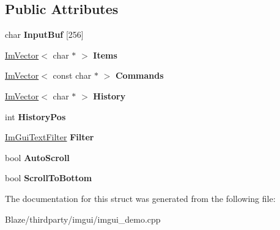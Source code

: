 \subsection*{Public Attributes}
\begin{DoxyCompactItemize}
\item 
\mbox{\label{structExampleAppConsole_ab30accde81ae6833bd2ecf35f43f01ab}} 
char {\bfseries Input\+Buf} \mbox{[}256\mbox{]}
\item 
\mbox{\label{structExampleAppConsole_acfde7d45fb733ac72d5d500168557b36}} 
\hyperlink{structImVector}{Im\+Vector}$<$ char $\ast$ $>$ {\bfseries Items}
\item 
\mbox{\label{structExampleAppConsole_a1eebee69cceb0345cf9d9b6e6beb9d03}} 
\hyperlink{structImVector}{Im\+Vector}$<$ const char $\ast$ $>$ {\bfseries Commands}
\item 
\mbox{\label{structExampleAppConsole_a11c7fa54e744288f3606e4d6521d6345}} 
\hyperlink{structImVector}{Im\+Vector}$<$ char $\ast$ $>$ {\bfseries History}
\item 
\mbox{\label{structExampleAppConsole_a2508db0a7d205947cea65b141d4ed589}} 
int {\bfseries History\+Pos}
\item 
\mbox{\label{structExampleAppConsole_a5526ec74c611e1152fb13162cd01e6da}} 
\hyperlink{structImGuiTextFilter}{Im\+Gui\+Text\+Filter} {\bfseries Filter}
\item 
\mbox{\label{structExampleAppConsole_a01c861ed21b9ec8de5e1ee2c762c627a}} 
bool {\bfseries Auto\+Scroll}
\item 
\mbox{\label{structExampleAppConsole_a69b1406795fd71a3757761b0767ea1c5}} 
bool {\bfseries Scroll\+To\+Bottom}
\end{DoxyCompactItemize}


The documentation for this struct was generated from the following file\+:\begin{DoxyCompactItemize}
\item 
Blaze/thirdparty/imgui/imgui\+\_\+demo.\+cpp\end{DoxyCompactItemize}
